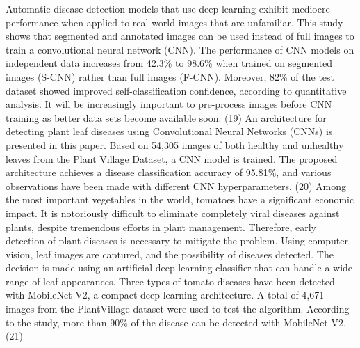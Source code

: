 \documentclass[conference]{IEEEtran}
\begin{document}
Automatic disease detection models that use deep learning exhibit mediocre performance when applied to real world images that are unfamiliar. This study shows that segmented and annotated images can be used instead of full images to train a convolutional neural network (CNN). The performance of CNN models on independent data increases from 42.3\% to 98.6\% when trained on segmented images (S-CNN) rather than full images (F-CNN). Moreover, 82\% of the test dataset showed improved self-classification confidence, according to quantitative analysis. It will be increasingly important to pre-process images before CNN training as better data sets become available soon. (19) An architecture for detecting plant leaf diseases using Convolutional Neural Networks (CNNs) is presented in this paper. Based on 54,305 images of both healthy and unhealthy leaves from the Plant Village Dataset, a CNN model is trained. The proposed architecture achieves a disease classification accuracy of 95.81\%, and various observations have been made with different CNN hyperparameters. (20) Among the most important vegetables in the world, tomatoes have a significant economic impact. It is notoriously difficult to eliminate completely viral diseases against plants, despite tremendous efforts in plant management. Therefore, early detection of plant diseases is necessary to mitigate the problem. Using computer vision, leaf images are captured, and the possibility of diseases detected. The decision is made using an artificial deep learning classifier that can handle a wide range of leaf appearances. Three types of tomato diseases have been detected with MobileNet V2, a compact deep learning architecture. A total of 4,671 images from the PlantVillage dataset were used to test the algorithm. According to the study, more than 90\% of the disease can be detected with MobileNet V2. (21) 
\end{document}
